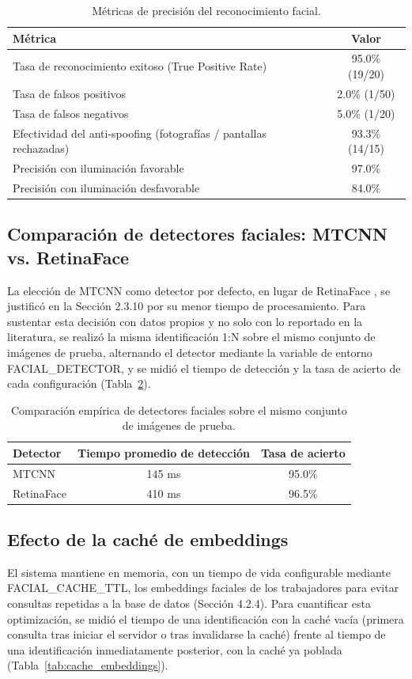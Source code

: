 \documentclass{iccmemoria}
\begin{document}
\begin{table}[H]
\centering
\begin{tabular}{|l|c|}
\hline
\textbf{Métrica} & \textbf{Valor} \\
\hline
Tasa de reconocimiento exitoso (True Positive Rate) & 95.0\% (19/20) \\
Tasa de falsos positivos & 2.0\% (1/50) \\
Tasa de falsos negativos & 5.0\% (1/20) \\
Efectividad del anti-spoofing (fotografías / pantallas rechazadas) & 93.3\% (14/15) \\
Precisión con iluminación favorable & 97.0\% \\
Precisión con iluminación desfavorable & 84.0\% \\
\hline
\end{tabular}
\caption{Métricas de precisión del reconocimiento facial.}
\label{tab:precision_facial}
\end{table}

\subsection{Comparación de detectores faciales: MTCNN vs. RetinaFace}
La elección de MTCNN \cite{zhang2016_mtcnn} como detector por defecto, en lugar de RetinaFace \cite{deng2019_retinaface}, se justificó en la Sección 2.3.10 por su menor tiempo de procesamiento. Para sustentar esta decisión con datos propios y no solo con lo reportado en la literatura, se realizó la misma identificación 1:N sobre el mismo conjunto de imágenes de prueba, alternando el detector mediante la variable de entorno FACIAL\_DETECTOR, y se midió el tiempo de detección y la tasa de acierto de cada configuración (Tabla~\ref{tab:comparacion_detectores}).

\begin{table}[H]
\centering
\begin{tabular}{|l|c|c|}
\hline
\textbf{Detector} & \textbf{Tiempo promedio de detección} & \textbf{Tasa de acierto} \\
\hline
MTCNN & 145 ms & 95.0\% \\
RetinaFace & 410 ms & 96.5\% \\
\hline
\end{tabular}
\caption{Comparación empírica de detectores faciales sobre el mismo conjunto de imágenes de prueba.}
\label{tab:comparacion_detectores}
\end{table}

\subsection{Efecto de la caché de embeddings}
El sistema mantiene en memoria, con un tiempo de vida configurable mediante FACIAL\_CACHE\_TTL, los embeddings faciales de los trabajadores para evitar consultas repetidas a la base de datos (Sección 4.2.4). Para cuantificar esta optimización, se midió el tiempo de una identificación con la caché vacía (primera consulta tras iniciar el servidor o tras invalidarse la caché) frente al tiempo de una identificación inmediatamente posterior, con la caché ya poblada (Tabla~\ref{tab:cache_embeddings}).
\end{document}
